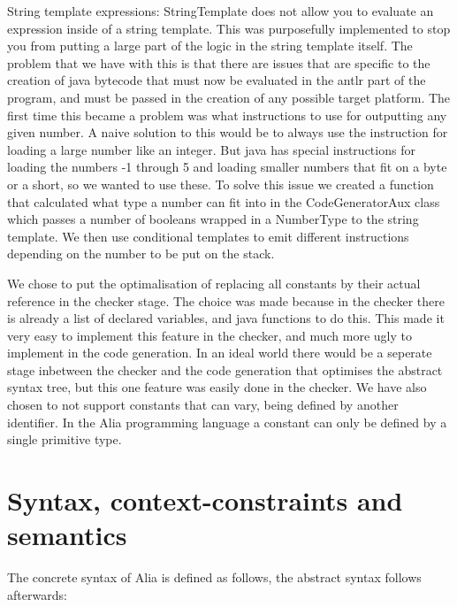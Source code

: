 \documentclass[paper=a4, fontsize=11pt]{article}
\numberwithin{equation}{section}		%
\numberwithin{figure}{section}			%
\numberwithin{table}{section}				%
\begin{document}
String template expressions: StringTemplate does not allow you to evaluate an expression inside of a string template. This was purposefully implemented to stop you from putting a large part of the logic in the string template itself. The problem that we have with this is that there are issues that are specific to the creation of java bytecode that must now be evaluated in the antlr part of the program, and must be passed in the creation of any possible target platform. The first time this became a problem was what instructions to use for outputting any given number. A naive solution to this would be to always use the instruction for loading a large number like an integer. But java has special instructions for loading the numbers -1 through 5 and loading smaller numbers that fit on a byte or a short, so we wanted to use these. To solve this issue we created a function that calculated what type a number can fit into in the CodeGeneratorAux class which passes a number of booleans wrapped in a NumberType to the string template. We then use conditional templates to emit different instructions depending on the number to be put on the stack.


We chose to put the optimalisation of replacing all constants by their actual reference in the checker stage. The choice was made because in the checker there is already a list of declared variables, and java functions to do this. This made it very easy to implement this feature in the checker, and much more ugly to implement in the code generation. In an ideal world there would be a seperate stage inbetween the checker and the code generation that optimises the abstract syntax tree, but this one feature was easily done in the checker. We have also chosen to not support constants that can vary, being defined by another identifier. In the Alia programming language a constant can only be defined by a single primitive type.



\section{Syntax, context-constraints and semantics}
The concrete syntax of Alia is defined as follows, the abstract syntax follows afterwards:
\end{document}
